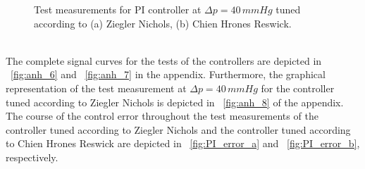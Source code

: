 \begin{figure}[ht]
  \centering
  \caption[Test measurements for PI controller at $\Delta{p}=40\,mmHg$]{Test measurements for PI controller at $\Delta{p}=40\,mmHg$ tuned according to (a) Ziegler Nichols, (b) Chien Hrones Reswick.}
  \label{fig:pi_contr_chr_zn}
\end{figure}
\\The complete signal curves for the tests of the controllers are depicted in \figurename~\ref{fig:anh_6} and \figurename~\ref{fig:anh_7} in the appendix. Furthermore, the graphical representation of the test measurement at $\Delta{p}=40\,mmHg$ for the controller tuned according to Ziegler Nichols is depicted in \figurename~\ref{fig:anh_8} of the appendix.
\\The course of the control error throughout the test measurements of the controller tuned according to Ziegler Nichols and the controller tuned according to Chien Hrones Reswick are depicted in \figurename~\ref{fig:PI_error_a} and \figurename~\ref{fig:PI_error_b}, respectively.
